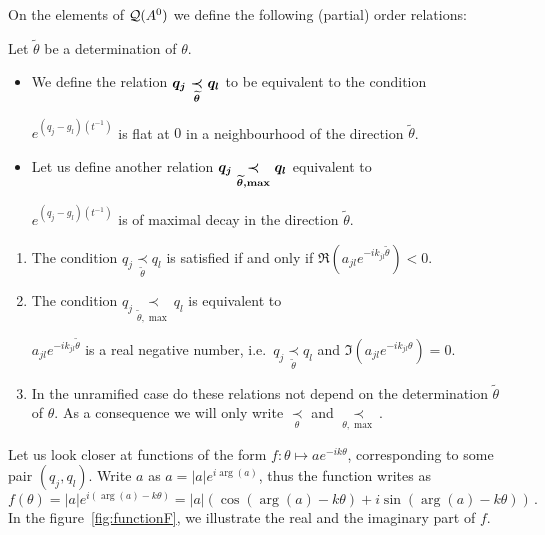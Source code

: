 On the elements of $\cQ(A^0)$ we define the following (partial) order
relations:
\begin{defn}
  Let $\tilde\theta$ be a determination of $\theta$.
  \begin{itemize}
    \item We define the relation
      $\boldmath q_j \underset{\tilde\theta}{\prec} q_l$ to be equivalent to
      the condition
      \begin{einr}
        $e^{(q_j-g_l)(t^{-1})}$ is flat at $0$ in a neighbourhood of the
        direction $\tilde\theta$.
      \end{einr}
    \item Let us define another relation
      $\boldmath q_j \underset{\tilde\theta,\max}{\prec} q_l$ equivalent to
      \begin{einr}
        $e^{(q_j-g_l)(t^{-1})}$ is of maximal decay in the direction
        $\tilde\theta$.
      \end{einr}
  \end{itemize}
  \begin{s-rem}
    \begin{enumerate}
      \item The condition $q_j \underset{\tilde\theta}{\prec} q_l$ is
        satisfied if and only if $\Re(a_{jl}e^{-ik_{jl}\tilde\theta})<0$.
      \item The condition $q_j \underset{\tilde\theta,\max}{\prec} q_l$ is
        equivalent to
        \begin{einr}
          $a_{jl}e^{-ik_{jl}\tilde\theta}$ is a real negative
          number, i.e.\ $q_j \underset{\tilde\theta}{\prec} q_l$ and
          $\Im(a_{jl}e^{-ik_{jl}\theta})=0$.
        \end{einr}
      \item In the unramified case do these relations not depend on the
        determination $\tilde\theta$ of $\theta$. As a consequence we will only
        write $\underset{\theta}{\prec}$ and $\underset{\theta,\max}{\prec}$.
    \end{enumerate}
  \end{s-rem}
\end{defn}
Let us look closer at functions of the form $f:\theta\mapsto ae^{-ik\theta}$,
corresponding to some pair $(q_j,q_l)$.
Write $a$ as $a=|a|e^{i\arg(a)}$, thus the function writes as
\[
  f(\theta)=|a|e^{i(\arg(a)-k\theta)}=
  |a|(\cos(\arg(a)-k\theta) + i\sin(\arg(a)-k\theta)) \,.
\]
In the figure~\ref{fig:functionF}, we illustrate the real and the imaginary
part of $f$.
